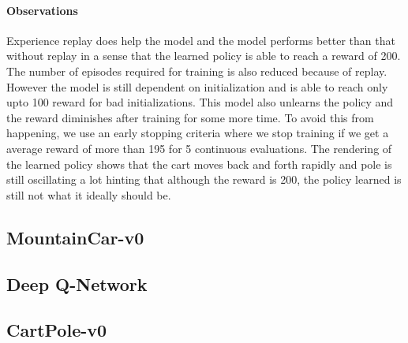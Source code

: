\documentclass[12pt]{article}
\begin{document}
\paragraph{Observations} Experience replay does help the model and the model performs better than that without replay in a sense that the learned policy is able to reach a reward of 200. The number of episodes required for training is also reduced because of replay. However the model is still dependent on initialization and is able to reach only upto 100 reward for bad initializations. This model also unlearns the policy and the reward diminishes after training for some more time. To avoid this from happening, we use an early stopping criteria where we stop training if we get a average reward of more than 195 for 5 continuous evaluations. The rendering of the learned policy shows that the cart moves back and forth rapidly and pole is still oscillating a lot hinting that although the reward is 200, the policy learned is still not what it ideally should be.

\pagebreak[4]
\subsection*{MountainCar-v0}

\pagebreak[4]
\subsection{Deep Q-Network}
\subsection*{CartPole-v0}
\end{document}
